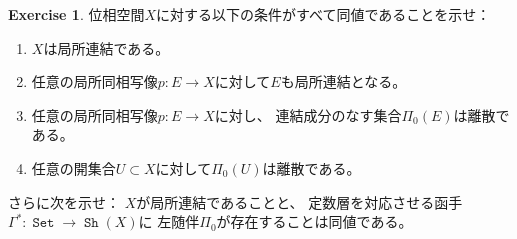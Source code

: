 \documentclass[uplatex]{jsarticle}
\theoremstyle{definition}
\newtheorem{prob}[prob]{Exercise}
\DeclareMathOperator{\sfSet}{\mathtt{Set}}
\DeclareMathOperator{\Sh}{\mathtt{Sh}}
\begin{document}
\begin{prob}\label{prob: 0.7}
  位相空間\(X\)に対する以下の条件がすべて同値であることを示せ：
  \begin{enumerate}
    \item \label{enumi: prob: 0.7.1}
    \(X\)は局所連結である。
    \item \label{enumi: prob: 0.7.2}
    任意の局所同相写像\(p:E\to X\)に対して\(E\)も局所連結となる。
    \item \label{enumi: prob: 0.7.3}
    任意の局所同相写像\(p:E\to X\)に対し、
    連結成分のなす集合\(\Pi_0(E)\)は離散である。
    \item \label{enumi: prob: 0.7.4}
    任意の開集合\(U\subset X\)に対して\(\Pi_0(U)\)は離散である。
  \end{enumerate}
  さらに次を示せ：
  \(X\)が局所連結であることと、
  定数層を対応させる函手\(\Gamma^*: \sfSet \to \Sh(X)\)に
  左随伴\(\Pi_0\)が存在することは同値である。
\end{prob}
\end{document}
